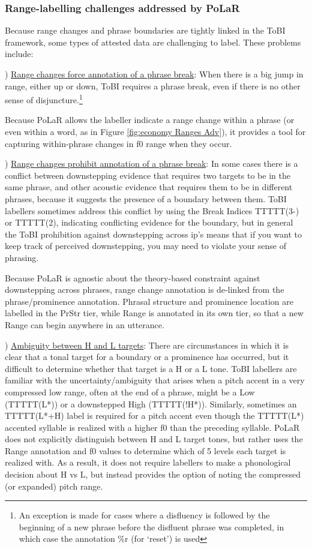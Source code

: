 \documentclass[11pt, twoside]{memoir}
\begin{document}
\subsubsection{Range-labelling challenges addressed by PoLaR}\label{sec:range-labelling-challenges}
Because range changes and phrase boundaries are tightly linked in the ToBI framework, some types of attested data are challenging to label.  These problems include:

) \uline{Range changes force annotation of a phrase break}: When there is a big jump in range, either up or down, ToBI requires a phrase break, even if there is no other sense of disjuncture.\footnote{An exception is made for cases where a disfluency is followed by the beginning of a new phrase before the disfluent phrase was completed, in which case the annotation \%r (for ‘reset’) is used}

Because PoLaR allows the labeller indicate a range change within a phrase (or even within a word, as in Figure \ref{fig:economy Ranges Adv}), it provides a tool for capturing within-phrase changes in f0 range when they occur. 

) \uline{Range changes prohibit annotation of a phrase break}: In some cases there is a conflict between downstepping evidence that requires two targets to be in the same phrase, and other acoustic evidence that requires them to be in different phrases, because it suggests the presence of a boundary between them. ToBI labellers sometimes address this conflict by using the Break Indices TTTTT(3-) or TTTTT(2), indicating conflicting evidence for the boundary, but in general the ToBI prohibition against downstepping across ip’s means that if you want to keep track of perceived downstepping, you may need to violate your sense of phrasing.

Because PoLaR is agnostic about the theory-based constraint against downstepping across phrases, range change annotation is de-linked from the phrase\slash prominence annotation. Phrasal structure and prominence location are labelled in the PrStr tier, while Range is annotated in its own tier, so that a new Range can begin anywhere in an utterance.

) \uline{Ambiguity between H and L targets}:  There are circumstances in which it is clear that a tonal target for a boundary or a prominence has occurred, but it difficult to determine whether that target is a H or a L tone.  ToBI labellers are familiar with the uncertainty\slash ambiguity that arises when a pitch accent in a very compressed low range, often at the end of a phrase, might be a Low (TTTTT(L*)) or a downstepped High (TTTTT(!H*)).  Similarly, sometimes an TTTTT(L*+H) label is required for a pitch accent even though the TTTTT(L*) accented syllable is realized with a higher f0 than the preceding syllable.  PoLaR does not explicitly distinguish between H and L target tones, but rather uses the Range annotation and f0 values to determine which of 5 levels each target is realized with.  As a result, it does not require labellers to make a phonological decision about H vs L, but instead provides the option of noting the compressed (or expanded) pitch range.
\end{document}
